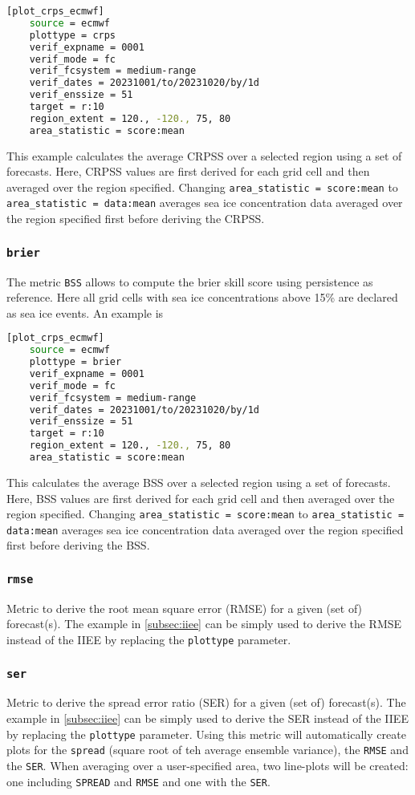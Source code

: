 \documentclass[DIV=10, parskip=full]{scrreprt}
\begin{document}
\begin{lstlisting}[language=bash]
	[plot_crps_ecmwf]
	source = ecmwf
	plottype = crps
	verif_expname = 0001
	verif_mode = fc
	verif_fcsystem = medium-range
	verif_dates = 20231001/to/20231020/by/1d
	verif_enssize = 51
	target = r:10
	region_extent = 120., -120., 75, 80
	area_statistic = score:mean
\end{lstlisting}
This example calculates the average CRPSS over a selected region using a set of forecasts. Here, CRPSS values are first derived for each grid cell and then averaged over the region specified. Changing \texttt{area\_statistic = score:mean} to \texttt{area\_statistic = data:mean}  averages sea ice concentration data averaged over the region specified first before deriving the CRPSS. 


\subsubsection{\texttt{brier}}
The metric \texttt{BSS} allows to compute the brier skill score using persistence as reference. Here all grid cells with sea ice concentrations above 15\% are declared as sea ice events. An example is

\begin{lstlisting}[language=bash]
	[plot_crps_ecmwf]
	source = ecmwf
	plottype = brier
	verif_expname = 0001
	verif_mode = fc
	verif_fcsystem = medium-range
	verif_dates = 20231001/to/20231020/by/1d
	verif_enssize = 51
	target = r:10
	region_extent = 120., -120., 75, 80
	area_statistic = score:mean
\end{lstlisting}
This calculates the average BSS over a selected region using a set of forecasts. Here, BSS values are first derived for each grid cell and then averaged over the region specified. Changing \texttt{area\_statistic = score:mean} to \texttt{area\_statistic = data:mean}  averages sea ice concentration data averaged over the region specified first before deriving the BSS.  


\subsubsection{\texttt{rmse}}
Metric to derive the root mean square error (RMSE) for a given (set of) forecast(s). The example in \ref{subsec:iiee} can be simply used to derive the RMSE instead of the IIEE by replacing the \texttt{plottype} parameter. 

\subsubsection{\texttt{ser}}
Metric to derive the spread error ratio (SER) for a given (set of) forecast(s). The example in \ref{subsec:iiee} can be simply used to derive the SER instead of the IIEE by replacing the \texttt{plottype} parameter. Using this metric will automatically create plots for the \texttt{spread} (square root of teh average ensemble variance), the \texttt{RMSE} and the \texttt{SER}. When averaging over a user-specified area, two line-plots will be created: one including \texttt{SPREAD} and \texttt{RMSE} and one with the \texttt{SER}.
\end{document}
